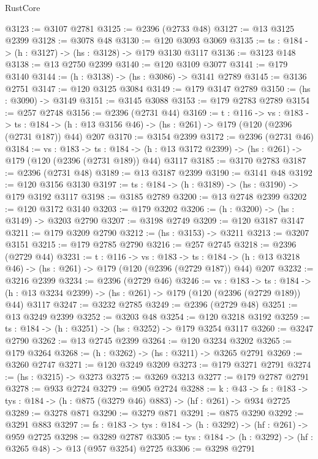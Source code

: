 \begin{lexlean}{RustCore}
\begin{coremodule}
@3123 := @3107 @2781
@3125 := @2396 (@2733 @48)
@3127 := @13 @3125 @2399
@3128 := @3078 @48
@3130 := @120 @3093 @3069
@3135 := {ts : @184} -> (h : @3127) -> (hs : @3128) -> @179 @3130 @3117
@3136 := @3123 @148
@3138 := @13 @2750 @2399
@3140 := @120 @3109 @3077
@3141 := @179 @3140
@3144 := (h : @3138) -> (hs : @3086) -> @3141 @2789
@3145 := @3136 @2751
@3147 := @120 @3125 @3084
@3149 := @179 @3147 @2789
@3150 := (hs : @3090) -> @3149
@3151 := @3145 @3088
@3153 := @179 @2783 @2789
@3154 := @257 @2748
@3156 := @2396 (@2731 @44)
@3169 := {t : @116} ->
  {vs : @183} ->
  {ts : @184} -> (h : @13 @3156 @46) -> (hs : @261) -> @179 (@120 (@2396 (@2731 @187)) @44) @207
@3170 := @3154 @2399
@3172 := @2396 (@2731 @46)
@3184 := {vs : @183} ->
  {ts : @184} -> (h : @13 @3172 @2399) -> (hs : @261) -> @179 (@120 (@2396 (@2731 @189)) @44) @3117
@3185 := @3170 @2783
@3187 := @2396 (@2731 @48)
@3189 := @13 @3187 @2399
@3190 := @3141 @48
@3192 := @120 @3156 @3130
@3197 := {ts : @184} -> (h : @3189) -> (hs : @3190) -> @179 @3192 @3117
@3198 := @3185 @2789
@3200 := @13 @2748 @2399
@3202 := @120 @3172 @3140
@3203 := @179 @3202
@3206 := (h : @3200) -> (hs : @3149) -> @3203 @2790
@3207 := @3198 @2749
@3209 := @120 @3187 @3147
@3211 := @179 @3209 @2790
@3212 := (hs : @3153) -> @3211
@3213 := @3207 @3151
@3215 := @179 @2785 @2790
@3216 := @257 @2745
@3218 := @2396 (@2729 @44)
@3231 := {t : @116} ->
  {vs : @183} ->
  {ts : @184} -> (h : @13 @3218 @46) -> (hs : @261) -> @179 (@120 (@2396 (@2729 @187)) @44) @207
@3232 := @3216 @2399
@3234 := @2396 (@2729 @46)
@3246 := {vs : @183} ->
  {ts : @184} -> (h : @13 @3234 @2399) -> (hs : @261) -> @179 (@120 (@2396 (@2729 @189)) @44) @3117
@3247 := @3232 @2785
@3249 := @2396 (@2729 @48)
@3251 := @13 @3249 @2399
@3252 := @3203 @48
@3254 := @120 @3218 @3192
@3259 := {ts : @184} -> (h : @3251) -> (hs : @3252) -> @179 @3254 @3117
@3260 := @3247 @2790
@3262 := @13 @2745 @2399
@3264 := @120 @3234 @3202
@3265 := @179 @3264
@3268 := (h : @3262) -> (hs : @3211) -> @3265 @2791
@3269 := @3260 @2747
@3271 := @120 @3249 @3209
@3273 := @179 @3271 @2791
@3274 := (hs : @3215) -> @3273
@3275 := @3269 @3213
@3277 := @179 @2787 @2791
@3278 := @933 @2724
@3279 := @905 @2724
@3288 := {k : @43} ->
  {fs : @183} -> {tys : @184} -> (h : @875 (@3279 @46) @883) -> (hf : @261) -> @934 @2725
@3289 := @3278 @871
@3290 := @3279 @871
@3291 := @875 @3290
@3292 := @3291 @883
@3297 := {fs : @183} -> {tys : @184} -> (h : @3292) -> (hf : @261) -> @959 @2725
@3298 := @3289 @2787
@3305 := {tys : @184} -> (h : @3292) -> (hf : @3265 @48) -> @13 (@957 @3254) @2725
@3306 := @3298 @2791

\end{coremodule}
\end{lexlean}
